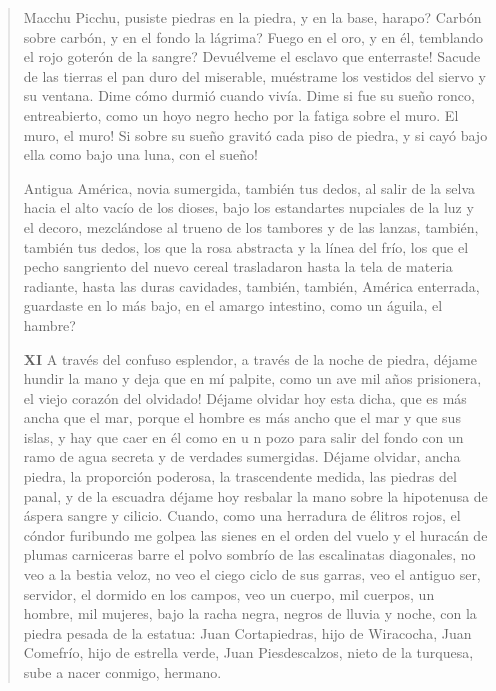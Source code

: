 \documentclass[12pt]{article}
\begin{document}
\begin{verse}
Macchu Picchu, pusiste  
piedras en la piedra, y en la base, harapo?  
Carbón sobre carbón, y en el fondo la lágrima?  
Fuego en el oro, y en él, temblando el rojo  
goterón de la sangre?  
Devuélveme el esclavo que enterraste!  
Sacude de las tierras el pan duro  
del miserable, muéstrame los vestidos  
del siervo y su ventana.  
Dime cómo durmió cuando vivía.  
Dime si fue su sueño  
ronco, entreabierto, como un hoyo negro  
hecho por la fatiga sobre el muro.  
El muro, el muro! Si sobre su sueño  
gravitó cada piso de piedra, y si cayó bajo ella  
como bajo una luna, con el sueño!  
	
Antigua América, novia sumergida,  
también tus dedos,  
al salir de la selva hacia el alto vacío de los dioses,  
bajo los estandartes nupciales de la luz y el decoro,  
mezclándose al trueno de los tambores y de las lanzas,  
también, también tus dedos,  
los que la rosa abstracta y la línea del frío, los  
que el pecho sangriento del nuevo cereal trasladaron  
hasta la tela de materia radiante, hasta las duras cavidades,  
también, también, América enterrada, guardaste en lo más bajo,  
en el amargo intestino, como un águila, el hambre?  
	
\vspace{\baselineskip}
{\scshape\bfseries XI}
A través del confuso esplendor,  
a través de la noche de piedra, déjame hundir la mano  
y deja que en mí palpite, como un ave mil años prisionera,  
el viejo corazón del olvidado!  
Déjame olvidar hoy esta dicha, que es más ancha que el mar,  
porque el hombre es más ancho que el mar y que sus islas,  
y hay que caer en él como en u n pozo para salir del fondo  
con un ramo de agua secreta y de verdades sumergidas.  
Déjame olvidar, ancha piedra, la proporción poderosa,  
la trascendente medida, las piedras del panal,  
y de la escuadra déjame hoy resbalar  
la mano sobre la hipotenusa de áspera sangre y cilicio.  
Cuando, como una herradura de élitros rojos, el cóndor furibundo  
me golpea las sienes en el orden del vuelo  
y el huracán de plumas carniceras barre el polvo sombrío  
de las escalinatas diagonales, no veo a la bestia veloz,  
no veo el ciego ciclo de sus garras,  
veo el antiguo ser, servidor, el dormido  
en los campos, veo un cuerpo, mil cuerpos, un hombre, mil mujeres,  
bajo la racha negra, negros de lluvia y noche,  
con la piedra pesada de la estatua:  
Juan Cortapiedras, hijo de Wiracocha,  
Juan Comefrío, hijo de estrella verde,  
Juan Piesdescalzos, nieto de la turquesa,  
sube a nacer conmigo, hermano.  


\end{verse}
\end{document}

